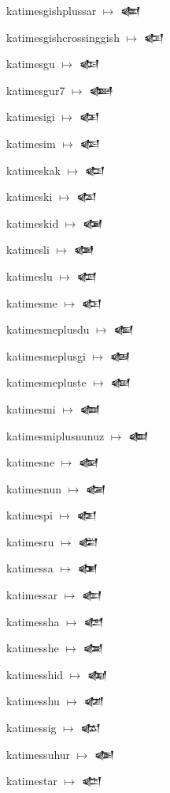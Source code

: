 {\noindent katimesgishplussar $\mapsto$ {\cufont 𒅩}\par
\noindent katimesgishcrossinggish $\mapsto$ {\cufont 𒅪}\par
\noindent katimesgu $\mapsto$ {\cufont 𒅫}\par
\noindent katimesgur7 $\mapsto$ {\cufont 𒅬}\par
\noindent katimesigi $\mapsto$ {\cufont 𒅭}\par
\noindent katimesim $\mapsto$ {\cufont 𒅮}\par
\noindent katimeskak $\mapsto$ {\cufont 𒅯}\par
\noindent katimeski $\mapsto$ {\cufont 𒅰}\par
\noindent katimeskid $\mapsto$ {\cufont 𒅱}\par
\noindent katimesli $\mapsto$ {\cufont 𒅲}\par
\noindent katimeslu $\mapsto$ {\cufont 𒅳}\par
\noindent katimesme $\mapsto$ {\cufont 𒅴}\par
\noindent katimesmeplusdu $\mapsto$ {\cufont 𒅵}\par
\noindent katimesmeplusgi $\mapsto$ {\cufont 𒅶}\par
\noindent katimesmepluste $\mapsto$ {\cufont 𒅷}\par
\noindent katimesmi $\mapsto$ {\cufont 𒅸}\par
\noindent katimesmiplusnunuz $\mapsto$ {\cufont 𒅹}\par
\noindent katimesne $\mapsto$ {\cufont 𒅺}\par
\noindent katimesnun $\mapsto$ {\cufont 𒅻}\par
\noindent katimespi $\mapsto$ {\cufont 𒅼}\par
\noindent katimesru $\mapsto$ {\cufont 𒅽}\par
\noindent katimessa $\mapsto$ {\cufont 𒅾}\par
\noindent katimessar $\mapsto$ {\cufont 𒅿}\par
\noindent katimessha $\mapsto$ {\cufont 𒆀}\par
\noindent katimesshe $\mapsto$ {\cufont 𒆁}\par
\noindent katimesshid $\mapsto$ {\cufont 𒆂}\par
\noindent katimesshu $\mapsto$ {\cufont 𒆃}\par
\noindent katimessig $\mapsto$ {\cufont 𒆄}\par
\noindent katimessuhur $\mapsto$ {\cufont 𒆅}\par
\noindent katimestar $\mapsto$ {\cufont 𒆆}\par
}
